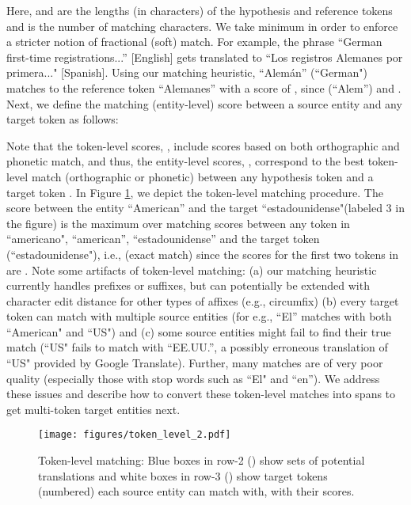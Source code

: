 \documentclass[11pt,a4paper]{article}
\begin{document}
Here,  and  are the lengths (in characters)
of the hypothesis and reference tokens
and  is the number of matching characters. 
We take minimum in order to enforce a stricter notion of fractional (soft) match. 
For example, the phrase ``German first-time registrations...'' [English]
gets translated to ``Los registros Alemanes por primera..." [Spanish]. 
Using our matching heuristic, ``Alem\'an'' (``German") 
matches to the reference token ``Alemanes'' with a score of , 
since  (``Alem'') and .
Next, we define the matching (entity-level) score between a source entity  
and any target token  as follows:


Note that the token-level scores, , include scores based on both orthographic and phonetic match, and thus, the entity-level scores, , correspond to the best token-level match (orthographic or phonetic) between any hypothesis token  and a target token .
In Figure \ref{fig:tok-level}, we depict the token-level matching procedure. 
The score between the entity ``American''
and the target ``estadounidense"(labeled 3 in the figure) 
is the maximum over matching scores between 
any token in ``americano", ``american'',  ``estadounidense'' 
and the target token (``estadounidense"), i.e.,  (exact match) 
since the scores for the first two tokens in  are . 
Note some artifacts of token-level matching: (a) our matching heuristic currently handles prefixes or suffixes, but can potentially be extended with character edit distance for other types of affixes (e.g., circumfix)
(b) every target token can match with multiple source entities 
(for e.g., ``El'' matches with both ``American" and ``US") 
and (c) some source entities might fail to find their true match 
(``US" fails to match with ``EE.UU.'', 
a possibly erroneous translation of ``US" provided by Google Translate). 
Further, many matches are of very poor quality 
(especially those with stop words such as ``El" and ``en''). 
We address these issues and describe how to convert these token-level matches 
into spans to get multi-token target entities next.

\begin{figure}[t!]
    \centering
    \texttt{[image: figures/token\_level\_2.pdf]}
    \caption{Token-level matching: Blue boxes in row-2 () show sets of potential translations and white boxes in row-3 () show target tokens (numbered) each source entity can match with, with their scores.}
\label{fig:tok-level}
\end{figure}
\end{document}
